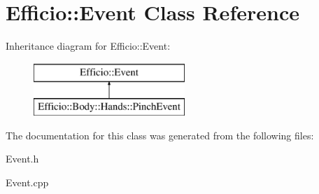 \hypertarget{class_efficio_1_1_event}{}\section{Efficio\+:\+:Event Class Reference}
\label{class_efficio_1_1_event}
Inheritance diagram for Efficio\+:\+:Event\+:\begin{figure}[H]
\begin{center}
\leavevmode
\includegraphics[height=2.000000cm]{class_efficio_1_1_event}
\end{center}
\end{figure}


The documentation for this class was generated from the following files\+:\begin{DoxyCompactItemize}
\item 
Event.\+h\item 
Event.\+cpp\end{DoxyCompactItemize}
